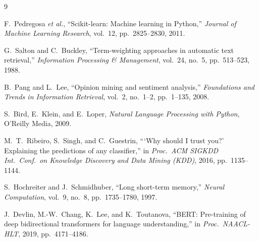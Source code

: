 \documentclass{article}
\begin{document}
\vfill\pagebreak
{\fontsize{8}{9}\selectfont
\begin{thebibliography}{9}

F.~Pedregosa \emph{et al.}, ``Scikit-learn: Machine learning in Python,''
\emph{Journal of Machine Learning Research}, vol.~12, pp.~2825--2830, 2011.

G.~Salton and C.~Buckley, ``Term-weighting approaches in automatic text
retrieval,'' \emph{Information Processing \& Management}, vol.~24, no.~5,
pp.~513--523, 1988.

B.~Pang and L.~Lee, ``Opinion mining and sentiment analysis,''
\emph{Foundations and Trends in Information Retrieval}, vol.~2, no.~1--2,
pp.~1--135, 2008.

S.~Bird, E.~Klein, and E.~Loper, \emph{Natural Language Processing with
Python}, O'Reilly Media, 2009.

M.~T.~Ribeiro, S.~Singh, and C.~Guestrin, ```Why should I trust you?'
Explaining the predictions of any classifier,'' in \emph{Proc.\ ACM SIGKDD
Int.\ Conf.\ on Knowledge Discovery and Data Mining (KDD)}, 2016,
pp.~1135--1144.

S.~Hochreiter and J.~Schmidhuber, ``Long short-term memory,''
\emph{Neural Computation}, vol.~9, no.~8, pp.~1735--1780, 1997.

J.~Devlin, M.-W.~Chang, K.~Lee, and K.~Toutanova, ``BERT: Pre-training of
deep bidirectional transformers for language understanding,'' in
\emph{Proc.\ NAACL-HLT}, 2019, pp.~4171--4186.

\end{thebibliography}
}
\end{document}
